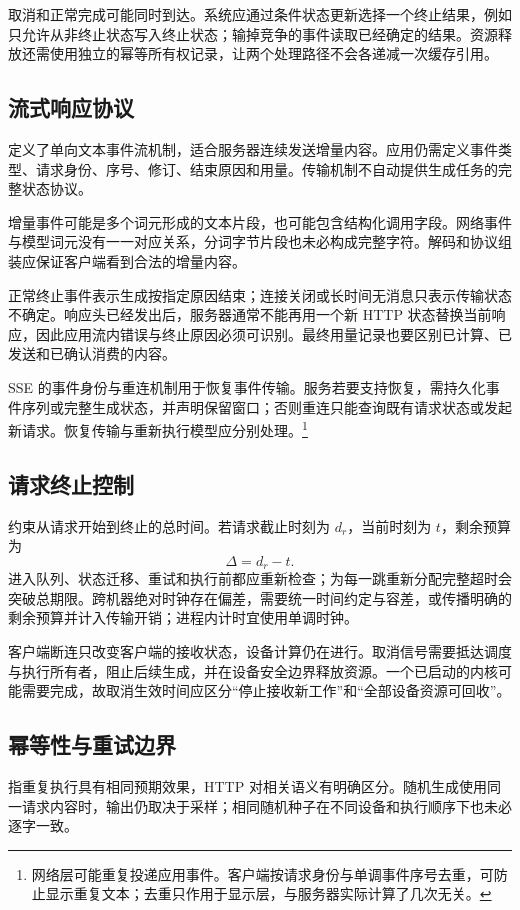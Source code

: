 \documentclass[../textbook.tex]{subfiles}
\begin{document}
取消和正常完成可能同时到达。系统应通过条件状态更新选择一个终止结果，例如只允许从非终止状态写入终止状态；输掉竞争的事件读取已经确定的结果。资源释放还需使用独立的幂等所有权记录，让两个处理路径不会各递减一次缓存引用。

\subsection{流式响应协议}
定义了单向文本事件流机制\cite{whatwg2026sse}，适合服务器连续发送增量内容。应用仍需定义事件类型、请求身份、序号、修订、结束原因和用量。传输机制不自动提供生成任务的完整状态协议。

增量事件可能是多个词元形成的文本片段，也可能包含结构化调用字段。网络事件与模型词元没有一一对应关系，分词字节片段也未必构成完整字符。解码和协议组装应保证客户端看到合法的增量内容。

正常终止事件表示生成按指定原因结束；连接关闭或长时间无消息只表示传输状态不确定。响应头已经发出后，服务器通常不能再用一个新 HTTP 状态替换当前响应，因此应用流内错误与终止原因必须可识别。最终用量记录也要区别已计算、已发送和已确认消费的内容。

SSE 的事件身份与重连机制用于恢复事件传输。服务若要支持恢复，需持久化事件序列或完整生成状态，并声明保留窗口；否则重连只能查询既有请求状态或发起新请求。恢复传输与重新执行模型应分别处理。\footnote{网络层可能重复投递应用事件。客户端按请求身份与单调事件序号去重，可防止显示重复文本；去重只作用于显示层，与服务器实际计算了几次无关。}

\subsection{请求终止控制}
约束从请求开始到终止的总时间。若请求截止时刻为 $d_r$，当前时刻为 $t$，剩余预算为
\begin{equation}
 \Delta=d_r-t.
\end{equation}
进入队列、状态迁移、重试和执行前都应重新检查；为每一跳重新分配完整超时会突破总期限。跨机器绝对时钟存在偏差，需要统一时间约定与容差，或传播明确的剩余预算并计入传输开销；进程内计时宜使用单调时钟。

客户端断连只改变客户端的接收状态，设备计算仍在进行。取消信号需要抵达调度与执行所有者，阻止后续生成，并在设备安全边界释放资源。一个已启动的内核可能需要完成，故取消生效时间应区分“停止接收新工作”和“全部设备资源可回收”。

\subsection{幂等性与重试边界}
指重复执行具有相同预期效果，HTTP 对相关语义有明确区分\cite{fielding2022http}。随机生成使用同一请求内容时，输出仍取决于采样；相同随机种子在不同设备和执行顺序下也未必逐字一致。
\end{document}

